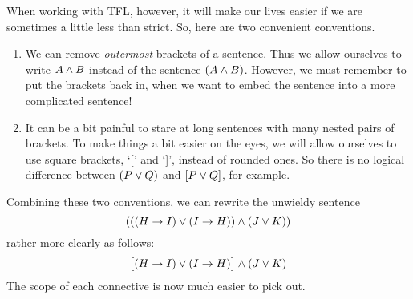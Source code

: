 When working with TFL, however, it will make our lives easier if we are sometimes a little less than strict. So, here are two convenient conventions.
\begin{enumerate}
\item We can remove \emph{outermost} brackets of a sentence. Thus we allow ourselves to write $A\mathbin{\wedge} B$ instead of the sentence $(A\mathbin{\wedge} B)$. However, we must remember to put the brackets back in, when we want to embed the sentence into a more complicated sentence!
\item It can be a bit painful to stare at long sentences with many nested pairs of brackets. To make things a bit easier on the eyes, we will  allow ourselves to use square brackets, `[' and `]', instead of rounded ones. So there is no logical difference between $(P\vee Q)$ and $[P\vee Q]$, for example.
\end{enumerate}

Combining these two conventions, we can rewrite the unwieldy sentence
$$(((H \rightarrow I) \vee (I \rightarrow H)) \mathbin{\wedge} (J \vee K))$$
rather more clearly as follows:
$$\bigl[(H \rightarrow I) \vee (I \rightarrow H)\bigr] \mathbin{\wedge} (J \vee K)$$
The scope of each connective is now much easier to pick out.

